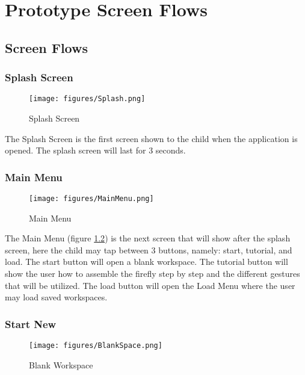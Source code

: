\chapter{Prototype Screen Flows}
\label{sec:appendixf}


\section{Screen Flows}


\subsection{Splash Screen}

\begin{figure}[H]
    \centering
    \texttt{[image: figures/Splash.png]}
    \caption{Splash Screen}
    \label{fig:splash}
\end{figure}

The Splash Screen is the first screen shown to the child when the application is opened. The splash screen will last for 3 seconds.

\subsection{Main Menu}

\begin{figure}[H]
    \centering
    \texttt{[image: figures/MainMenu.png]}
    \caption{Main Menu}
    \label{fig:mainmenu}
\end{figure}

The Main Menu (figure \ref{fig:mainmenu}) is the next screen that will show after the splash screen, here the child may tap between 3 buttons, namely: start, tutorial, and load. The start button will open a blank workspace. The tutorial button will show the user how to assemble the firefly step by step and the different gestures that will be utilized. The load button will open the Load Menu where the user may load saved workspaces.

\subsection{Start New}

\begin{figure}[H]
    \centering
    \texttt{[image: figures/BlankSpace.png]}
    \caption{Blank Workspace}
    \label{fig:blankworkspace}
\end{figure}

